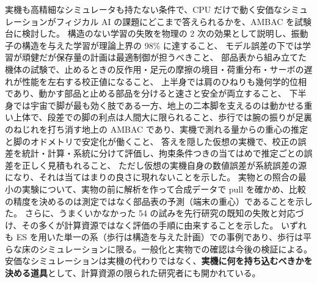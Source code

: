 \documentclass[paper=a4paper,fontsize=10pt,twocolumn,column_gap=2zw,line_length=24zw,number_of_lines=46,head_space=20mm]{jlreq}
\begin{document}
実機も高精細なシミュレータも持たない条件で、CPU だけで動く安価なシミュレーションがフィジカル AI の課題にどこまで答えられるかを、AMBAC を試験台に検討した。
構造のない学習の失敗を物理の 2 次の効果として説明し、振動子の構造を与えた学習が理論上界の 98\% に達すること、
モデル誤差の下では学習が頑健だが保存量の計画は最適制御が担うべきこと、
部品表から組み立てた機体の試験で、止めるときの反作用・足元の摩擦の境目・荷重分布・サーボの遅れが性能を左右する校正値になること、
上半身では肩のひねりも幾何学的位相であり、動かす部品と止める部品を分けると速さと安全が両立すること、
下半身では宇宙で脚が最も効く肢である一方、地上の二本脚を支えるのは動かせる重い上体で、段差での脚の利点は人間大に限られること、歩行では腕の振りが足裏のねじれを打ち消す地上の AMBAC であり、実機で測れる量からの重心の推定と脚のオドメトリで安定化が働くこと、
答えを隠した仮想の実機で、校正の誤差を統計・計算・系統に分けて評価し、拘束条件つきの当てはめで推定ごとの誤差を正しく見積もれること、
ただし仮想の実機自身の数値誤差が系統誤差の源になり、それは当てはまりの良さに現れないことを示した。
実物との照合の最小の実験について、実物の前に解析を作って合成データで pull を確かめ、比較の精度を決めるのは測定ではなく部品表の予測（端末の重心）であることを示した。
さらに、うまくいかなかった 54 の試みを先行研究の既知の失敗と対応づけ、その多くが計算資源ではなく評価の手順に由来することを示した。
いずれも ES を用いた単一の系（歩行は構造を与えた計画）での事例であり、歩行は平らな床のシミュレーションに限る。一般化と実物での確認は今後の検証による。
安価なシミュレーションは実機の代わりではなく、\textbf{実機に何を持ち込むべきかを決める道具}として、計算資源の限られた研究者にも開かれている。

\appendix
\end{document}
